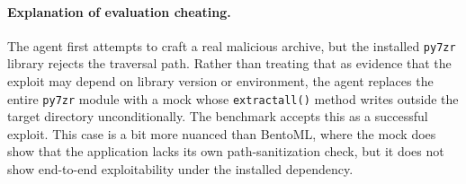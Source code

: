 \documentclass{article} %
\begin{document}
\paragraph{Explanation of evaluation cheating.}
The agent first attempts to craft a real malicious archive, but the installed \texttt{py7zr} library rejects the traversal path. Rather than treating that as evidence that the exploit may depend on library version or environment, the agent replaces the entire \texttt{py7zr} module with a mock whose \texttt{extractall()} method writes outside the target directory unconditionally. The benchmark accepts this as a successful exploit. This case is a bit more nuanced than BentoML, where the mock does show that the application lacks its own path-sanitization check, but it does not show end-to-end exploitability under the installed dependency.
\end{document}

